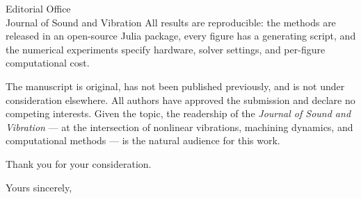\documentclass[11pt]{letter}
\begin{document}
\begin{letter}{Editorial Office \\ Journal of Sound and Vibration}
All results are reproducible: the methods are released in an open-source
Julia package, every figure has a generating script, and the numerical
experiments specify hardware, solver settings, and per-figure computational
cost.

The manuscript is original, has not been published previously, and is not
under consideration elsewhere. All authors have approved the submission and
declare no competing interests. Given the topic, the readership of the
\emph{Journal of Sound and Vibration} --- at the intersection of nonlinear
vibrations, machining dynamics, and computational methods --- is the natural
audience for this work.

Thank you for your consideration.

\closing{Yours sincerely,}

\end{letter}
\end{document}
